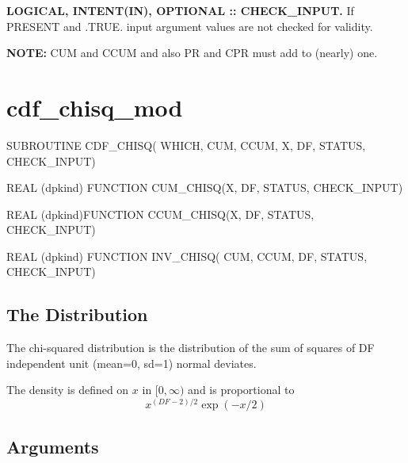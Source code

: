 \documentclass[12pt,dvips]{article}
\newcommand{\mysection}[1]{\color{blue}
             \section{#1} \normalcolor}
\newcommand{\mysubsection}[1] {\color{green}
             \subsection{#1} \normalcolor}
\newcommand{\myitem}[1]{\item{\bf \color{Violet} #1 \normalcolor}}
\begin{document}
\begin{description}
\myitem{LOGICAL, INTENT(IN), OPTIONAL :: CHECK\_INPUT.}  If PRESENT
and .TRUE. input argument values are not checked for validity.

{\bf NOTE:} CUM and CCUM and also PR and CPR must add to (nearly) one.

\end{description}

\pagebreak

\mysection{cdf\_chisq\_mod}

\begin{description}

\item SUBROUTINE CDF\_CHISQ( WHICH, CUM, CCUM, X, DF,
STATUS, CHECK\_INPUT)

\item    REAL   (dpkind)   FUNCTION    CUM\_CHISQ(X,
DF, STATUS, CHECK\_INPUT)

\item    REAL    (dpkind)FUNCTION    CCUM\_CHISQ(X,
DF, STATUS, CHECK\_INPUT)

\item  REAL (dpkind) FUNCTION  INV\_CHISQ(  CUM, CCUM,
DF, STATUS, CHECK\_INPUT)

\end{description}

\mysubsection{The Distribution}

The chi-squared distribution is the  distribution of the sum of squares
of DF independent unit (mean=0, sd=1) normal deviates.

The density  is defined on $x$ in $[0,\infty)$ and
is proportional to
\[ x^{(DF-2)/2} \exp(-x/2) \]

\mysubsection{Arguments}
\end{document}
